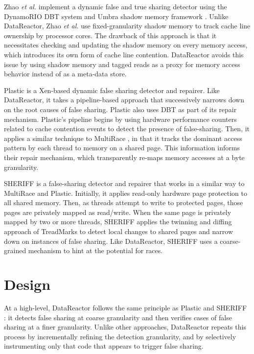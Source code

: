 \documentclass{sig-alternate}
\newcommand{\Toolname}{DataReactor}
\begin{document}

\newcommand{\DrContention}{Zhao \emph{et al.}}

\DrContention{} \cite{DrContention} implement a dynamic false and true sharing detector using the DynamoRIO \cite{DynamoRIO}
DBT system and Umbra shadow memory framework \cite{Umbra}. Unlike \Toolname{}, \DrContention{} use fixed-granularity
shadow memory to track cache line ownership by processor cores. The drawback of this approach is that it necessitates checking
and updating the shadow memory on every memory access, which introduces its own form of cache line contention. \Toolname{}
avoids this issue by using shadow memory and tagged reads as a proxy for memory access behavior instead of as a meta-data store.

Plastic \cite{Plastic} is a Xen-based dynamic false sharing detector and repairer. Like \Toolname{}, it takes a pipeline-based
approach that successively narrows down on the root causes of false sharing. Plastic also uses DBT as part of its
repair mechanism. Plastic's pipeline begins by using hardware performance counters related to cache contention
events to detect the presence of false-sharing. Then, it applies a similar technique to MultiRace \cite{MultiRace}, in
that it tracks the dominant access pattern by each thread to memory on a shared page. This information informs
their repair mechanism, which transparently re-maps memory accesses at a byte granularity.

SHERIFF \cite{SHERIFF} is a false-sharing detector and repairer that works in a similar way to MultiRace and Plastic. Initially,
it applies read-only hardware page protection to all shared memory. Then, as threads attempt to write to protected pages, those
pages are privately mapped as read/write. When the same page is privately mapped by two or more threads, SHERIFF applies
the twinning and diffing approach of TreadMarks \cite{TreadMarks} to detect local changes to shared pages and narrow down
on instances of false sharing. Like \Toolname{}, SHERIFF uses a coarse-grained mechanism to hint at the potential for races.

\section{Design}\label{sec:design}

At a high-level, \Toolname{} follows the same principle as Plastic \cite{Plastic} and SHERIFF \cite{SHERIFF}: it detects
false sharing at coarse granularity and then verifies cases of false sharing at a finer granularity. Unlike other approaches,
\Toolname{} repeats this process by incrementally refining the detection granularity, and by selectively instrumenting only
that code that appears to trigger false sharing.
\end{document}

